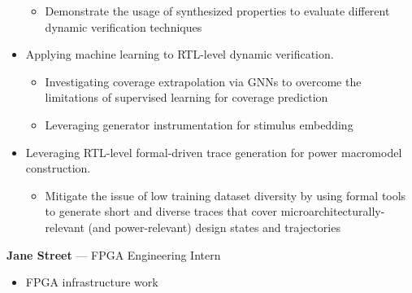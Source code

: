 \documentclass[10pt]{article}
\begin{document}
\begin{itemize}
\begin{itemize}
        \item Demonstrate the usage of synthesized properties to evaluate different dynamic verification techniques
    \end{itemize}
    \item Applying machine learning to RTL-level dynamic verification.
    \begin{itemize}
        \item Investigating coverage extrapolation via GNNs to overcome the limitations of supervised learning for coverage prediction
        \item Leveraging generator instrumentation for stimulus embedding
    \end{itemize}
    \item Leveraging RTL-level formal-driven trace generation for power macromodel construction.
    \begin{itemize}
        \item Mitigate the issue of low training dataset diversity by using formal tools to generate short and diverse traces that cover microarchitecturally-relevant (and power-relevant) design states and trajectories
    \end{itemize}
\end{itemize}
\vspace{0.2cm}

 \textbf{Jane Street} --- FPGA Engineering Intern
\begin{itemize}
    \item FPGA infrastructure work
\end{itemize}
\vspace{0.2cm}
\end{document}
